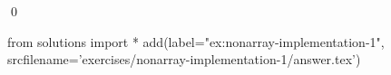 
\begin{ex} 
  \label{ex:nonarray-implementation-1}
  
  \qed
\end{ex} 
\begin{python0}
from solutions import *
add(label="ex:nonarray-implementation-1",
    srcfilename='exercises/nonarray-implementation-1/answer.tex') 
\end{python0}
